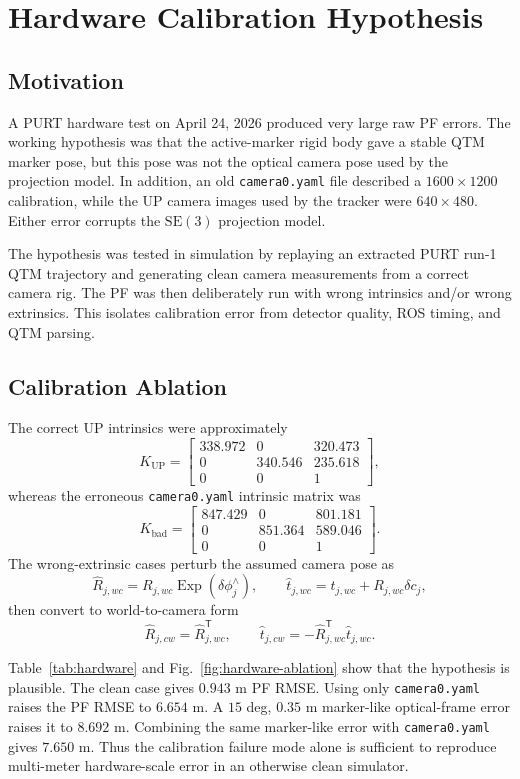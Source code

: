 \documentclass{aiaa-tc}
\newcommand{\SE}{\mathrm{SE}}
\newcommand{\Exp}{\operatorname{Exp}}
\newcommand{\T}{\mathsf{T}}
\begin{document}
\section{Hardware Calibration Hypothesis}

\subsection{Motivation}

A PURT hardware test on April 24, 2026 produced very large raw PF errors.  The
working hypothesis was that the active-marker rigid body gave a stable QTM
marker pose, but this pose was not the optical camera pose used by the
projection model.  In addition, an old \texttt{camera0.yaml} file described a
\(1600\times1200\) calibration, while the UP camera images used by the tracker
were \(640\times480\).  Either error corrupts the \(\SE(3)\) projection model.

The hypothesis was tested in simulation by replaying an extracted PURT run-1
QTM trajectory and generating clean camera measurements from a correct camera
rig.  The PF was then deliberately run with wrong intrinsics and/or wrong
extrinsics.  This isolates calibration error from detector quality, ROS timing,
and QTM parsing.

\subsection{Calibration Ablation}

The correct UP intrinsics were approximately
\[
K_{\mathrm{UP}}=
\begin{bmatrix}
338.972 & 0 & 320.473\\
0 & 340.546 & 235.618\\
0 & 0 & 1
\end{bmatrix},
\]
whereas the erroneous \texttt{camera0.yaml} intrinsic matrix was
\[
K_{\mathrm{bad}}=
\begin{bmatrix}
847.429 & 0 & 801.181\\
0 & 851.364 & 589.046\\
0 & 0 & 1
\end{bmatrix}.
\]
The wrong-extrinsic cases perturb the assumed camera pose as
\[
\hat R_{j,wc}
=
R_{j,wc}\Exp(\delta\phi_j^\wedge),
\qquad
\hat t_{j,wc}
=
t_{j,wc}+R_{j,wc}\delta c_j,
\]
then convert to world-to-camera form
\[
\hat R_{j,cw}=\hat R_{j,wc}^{\T},
\qquad
\hat t_{j,cw}
=
-\hat R_{j,wc}^{\T}\hat t_{j,wc}.
\]

Table~\ref{tab:hardware} and Fig.~\ref{fig:hardware-ablation} show that the
hypothesis is plausible.  The clean case gives \(0.943\) m PF RMSE.  Using only
\texttt{camera0.yaml} raises the PF RMSE to \(6.654\) m.  A \(15\) deg,
\(0.35\) m marker-like optical-frame error raises it to \(8.692\) m.  Combining
the same marker-like error with \texttt{camera0.yaml} gives \(7.650\) m.  Thus
the calibration failure mode alone is sufficient to reproduce multi-meter
hardware-scale error in an otherwise clean simulator.
\end{document}
